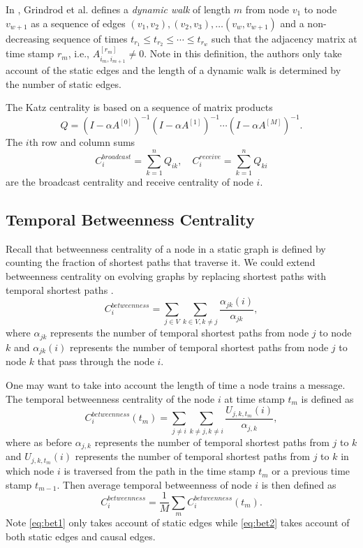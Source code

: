 \documentclass[12pt]{article}
\theoremstyle{definition}
\begin{document}
In \cite{grindrod11}, Grindrod et al. defines a \emph{dynamic walk} of length $m$ from
node $v_1$ to node $v_{w+1}$  as a sequence of edges
$(v_1, v_2), (v_2, v_3), \ldots (v_w, v_{w+1})$ and a non-decreasing sequence of times
$t_{r_1} \leq t_{r_2} \leq \cdots \leq t_{r_w}$ such that the adjacency matrix at time stamp
$r_m$, i.e., $A_{i_m, i_{m+1}}^{[r_m]} \ne 0$. Note in this definition, the authors only take account of the static edges and the length of a dynamic walk is determined by the number of static edges.

The Katz centrality is based on a sequence of matrix products
\begin{equation}
\label{eq:katz}
Q = (I - \alpha A^{[0]})^{-1}(I - \alpha A^{[1]})^{-1} \cdots (I - \alpha A^{[M]})^{-1}.
\end{equation}
The $i$th row and column sums
$$
C_i^{broadcast} = \sum_{k=1}^n Q_{ik}, \quad C_i^{receive} = \sum_{k=1}^n Q_{ki}
$$
are the broadcast centrality and receive centrality of node $i$.

\subsection{Temporal Betweenness Centrality}
\label{sec:temp-betw-centr}

Recall that betweenness centrality of a node in a static graph is defined by counting the fraction of shortest paths that traverse it.
We could extend
betweenness centrality on evolving graphs by replacing shortest paths with temporal shortest paths \cite{nicosia13}.
\begin{equation}
  \label{eq:bet1}
C_i^{betweenness} = \sum_{j \in V}\sum_{k \in V, k \ne j}\frac{\alpha_{jk}(i)}{\alpha_{jk}},
\end{equation}
where $\alpha_{jk}$ represents the number of temporal shortest paths from node $j$ to node $k$ and $\alpha_{jk}(i)$ represents the number of temporal shortest paths from node $j$ to node $k$ that pass through the node $i$.

One may want to take into account the length of time a node trains a message. The temporal betweenness centrality of the node $i$ at time stamp $t_m$ is defined as
\begin{equation}
  \label{eq:bet2}
  C_i^{betweenness}(t_m) = \sum_{j\ne i}\sum_{k\ne j, k\ne i}\frac{U_{j,k,t_m}(i)}{\alpha_{j,k}},
\end{equation}
where as before $\alpha_{j,k}$ represents the number of temporal shortest paths from $j$ to $k$ and $U_{j,k,t_m}(i)$ represents the number of temporal shortest paths from $j$ to $k$ in which node $i$ is traversed from
the path in the time stamp $t_m$ or a previous time stamp $t_{m-1}$. Then
average temporal betweenness of node $i$ is then defined as
$$
  C_i^{betweenness} = \frac{1}{M}\sum_m C_i^{betweenness}(t_m).
$$
Note \eqref{eq:bet1} only takes account of static edges while \eqref{eq:bet2} takes account of both static edges and causal edges.
\end{document}
